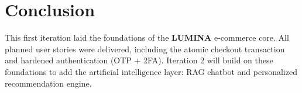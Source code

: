 \section*{Conclusion}
This first iteration laid the foundations of the \textbf{LUMINA} e-commerce core.
All planned user stories were delivered, including the atomic checkout transaction
and hardened authentication (OTP + 2FA).
Iteration 2 will build on these foundations to add the artificial intelligence
layer: RAG chatbot and personalized recommendation engine.
